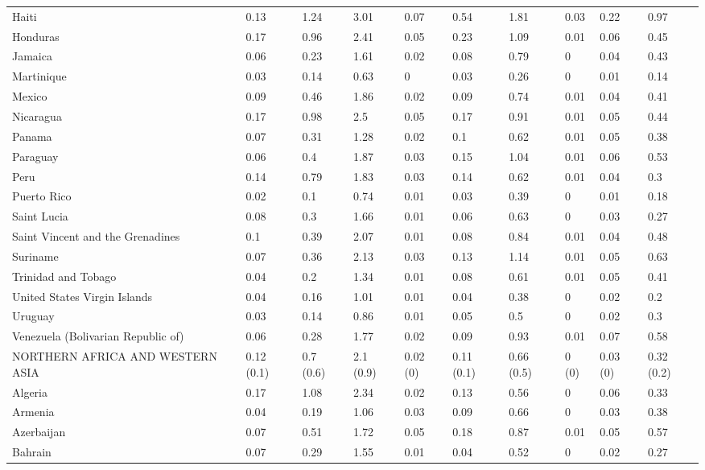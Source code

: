 \begin{longtable}[t]{llllllllll}
Haiti & 0.13 & 1.24 & 3.01 & 0.07 & 0.54 & 1.81 & 0.03 & 0.22 & 0.97\\
Honduras & 0.17 & 0.96 & 2.41 & 0.05 & 0.23 & 1.09 & 0.01 & 0.06 & 0.45\\
Jamaica & 0.06 & 0.23 & 1.61 & 0.02 & 0.08 & 0.79 & 0 & 0.04 & 0.43\\
Martinique & 0.03 & 0.14 & 0.63 & 0 & 0.03 & 0.26 & 0 & 0.01 & 0.14\\
Mexico & 0.09 & 0.46 & 1.86 & 0.02 & 0.09 & 0.74 & 0.01 & 0.04 & 0.41\\
Nicaragua & 0.17 & 0.98 & 2.5 & 0.05 & 0.17 & 0.91 & 0.01 & 0.05 & 0.44\\
Panama & 0.07 & 0.31 & 1.28 & 0.02 & 0.1 & 0.62 & 0.01 & 0.05 & 0.38\\
Paraguay & 0.06 & 0.4 & 1.87 & 0.03 & 0.15 & 1.04 & 0.01 & 0.06 & 0.53\\
Peru & 0.14 & 0.79 & 1.83 & 0.03 & 0.14 & 0.62 & 0.01 & 0.04 & 0.3\\
Puerto Rico & 0.02 & 0.1 & 0.74 & 0.01 & 0.03 & 0.39 & 0 & 0.01 & 0.18\\
Saint Lucia & 0.08 & 0.3 & 1.66 & 0.01 & 0.06 & 0.63 & 0 & 0.03 & 0.27\\
Saint Vincent and the Grenadines & 0.1 & 0.39 & 2.07 & 0.01 & 0.08 & 0.84 & 0.01 & 0.04 & 0.48\\
Suriname & 0.07 & 0.36 & 2.13 & 0.03 & 0.13 & 1.14 & 0.01 & 0.05 & 0.63\\
Trinidad and Tobago & 0.04 & 0.2 & 1.34 & 0.01 & 0.08 & 0.61 & 0.01 & 0.05 & 0.41\\
United States Virgin Islands & 0.04 & 0.16 & 1.01 & 0.01 & 0.04 & 0.38 & 0 & 0.02 & 0.2\\
Uruguay & 0.03 & 0.14 & 0.86 & 0.01 & 0.05 & 0.5 & 0 & 0.02 & 0.3\\
Venezuela (Bolivarian Republic of) & 0.06 & 0.28 & 1.77 & 0.02 & 0.09 & 0.93 & 0.01 & 0.07 & 0.58\\
NORTHERN AFRICA AND WESTERN ASIA & 0.12 (0.1) & 0.7 (0.6) & 2.1 (0.9) & 0.02 (0) & 0.11 (0.1) & 0.66 (0.5) & 0 (0) & 0.03 (0) & 0.32 (0.2)\\
Algeria & 0.17 & 1.08 & 2.34 & 0.02 & 0.13 & 0.56 & 0 & 0.06 & 0.33\\
Armenia & 0.04 & 0.19 & 1.06 & 0.03 & 0.09 & 0.66 & 0 & 0.03 & 0.38\\
Azerbaijan & 0.07 & 0.51 & 1.72 & 0.05 & 0.18 & 0.87 & 0.01 & 0.05 & 0.57\\
Bahrain & 0.07 & 0.29 & 1.55 & 0.01 & 0.04 & 0.52 & 0 & 0.02 & 0.27\\

\end{longtable}
